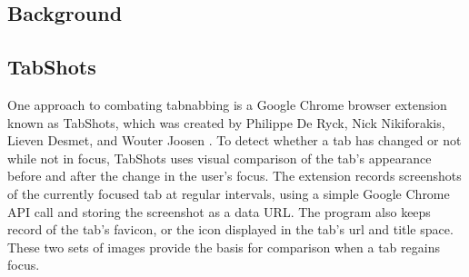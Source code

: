 \documentclass[12pt]{article}
\begin{document}
\begin{doublespace}
\section{Background}
\begin{comment}
Phishing attacks are not a new occurrence; they have been around since there has been personal data or credentials to steal. However, ``tabnabbing'' is a relatively recent addition to the list of phishing techniques, coined by Aza Raskin in 2010 \cite{Raskin}. Tabnabbing is a phishing technique that takes advantage of two commonly exhibited user behaviors for modern browser usage. The first is that users often open several tabs in a browser window and navigate between them without closing previous tabs. The second is the user tendency to leave browsers open for extended periods of time while away from their computers in order to access the pages more easily upon their return. 
\end{comment}

\subsection{TabShots}
\begin{comment}
One approach to combating tabnabbing is an extension known as TabShots, a program created by Philippe De Ryck, Nick Nikiforakis, Lieven Desmet, and Wouter Joosen \cite{TabShots}. TabShots continuously takes screenshots of tab and compares them to the previous ones and highlights any changes in red yellow or green depending on how many changes were made. When the user navigates back to a tab that has been altered in a tabnabbing attack, they will see the highlighted portions of the screen and receive a notification that the tab has been altered. 
Performance inpact on larger screens
Relies on user to make decision
\end{comment}

One approach to combating tabnabbing is a Google Chrome browser extension known as TabShots, which was created by Philippe De Ryck, Nick Nikiforakis, Lieven Desmet, and Wouter Joosen \cite{TabShots}.  To detect whether a tab has changed or not while not in focus, TabShots uses visual comparison of the tab's appearance before and after the change in the user's focus.  The extension records screenshots of the currently focused tab at regular intervals, using a simple Google Chrome API call and storing the screenshot as a data URL.  The program also keeps record of the tab's favicon, or the icon displayed in the tab's url and title space.  These two sets of images provide the basis for comparison when a tab regains focus.


\end{doublespace}
\end{document}
